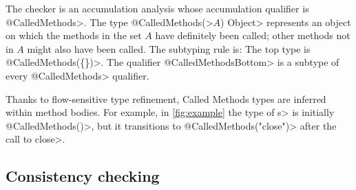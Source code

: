 The checker is an accumulation analysis whose accumulation qualifier is \<@CalledMethods>.
The type \<@CalledMethods(>$A$\<) Object>
represents an object on which the methods in the set $A$ have definitely
been called; other methods not in $A$ might also have been called.
The subtyping
rule is:
The top type is \<@CalledMethods(\{\})>.
The qualifier \<@CalledMethodsBottom> is a subtype of every \<@CalledMethods> qualifier.

Thanks to flow-sensitive type refinement,
Called Methods types are inferred within method bodies.  For example,
in \cref{fig:example} the type of \<s> is initially \<@CalledMethods({})>,
but it transitions to \<@CalledMethods("close")> after the call to \<close>.


\subsection{Consistency checking}
\label{sec:must-call-invoked}

